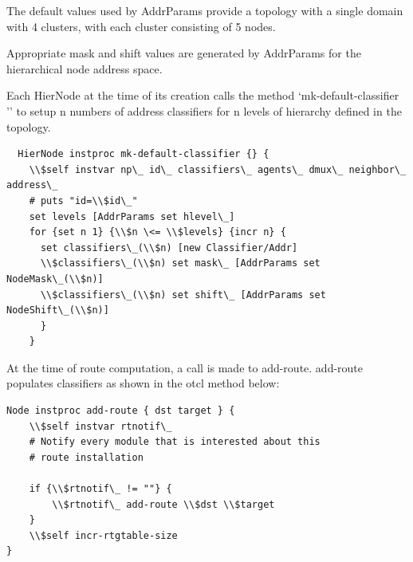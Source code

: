 The default values used by AddrParams provide a topology with a single
domain with 4 clusters, with each cluster consisting of 5 nodes.

Appropriate mask and shift values are generated by AddrParams for the
hierarchical node address space.

Each HierNode at the time of its creation calls the method
`mk-default-classifier '' to setup n numbers of address
classifiers for n levels of hierarchy defined in the topology.

\begin{verbatim}
  HierNode instproc mk-default-classifier {} {
    \\$self instvar np\_ id\_ classifiers\_ agents\_ dmux\_ neighbor\_ address\_ 
    # puts "id=\\$id\_"
    set levels [AddrParams set hlevel\_]
    for {set n 1} {\\$n \<= \\$levels} {incr n} {
      set classifiers\_(\\$n) [new Classifier/Addr]
      \\$classifiers\_(\\$n) set mask\_ [AddrParams set NodeMask\_(\\$n)]
      \\$classifiers\_(\\$n) set shift\_ [AddrParams set NodeShift\_(\\$n)]
      }
    }
\end{verbatim}

At the time of route computation, a call is made to add-route.
add-route populates classifiers as shown in the otcl method below:

\begin{verbatim}
Node instproc add-route { dst target } {
 	\\$self instvar rtnotif\_
	# Notify every module that is interested about this 
	# route installation
	
	if {\\$rtnotif\_ != ""} {
		\\$rtnotif\_ add-route \\$dst \\$target
	}
	\\$self incr-rtgtable-size
}
\end{verbatim}

